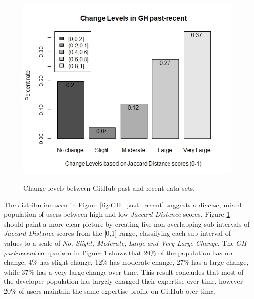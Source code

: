         \begin{figure}
          \centering
          \includegraphics[width=\textwidth]{figures/change_level_GH_past-recent.jpeg}\\
          \caption{Change levels between GitHub past and recent data sets.}
          \label{fig:change_GH_past_recent}
        \end{figure}
        
        The distribution seen in Figure \ref{fig:GH_past_recent} suggests a diverse, mixed population of users between high and low \emph{Jaccard Distance} scores. Figure \ref{fig:change_GH_past_recent} should paint a more clear picture by creating five non-overlapping sub-intervals of \emph{Jaccard Distance} scores from the [0,1] range, classifying each sub-interval of values to a scale of \emph{No, Slight, Moderate, Large and Very Large Change}. The \emph{GH past-recent} comparison in Figure \ref{fig:change_GH_past_recent} shows that 20\% of the population has no change, 4\% has slight change, 12\% has moderate change, 27\% has a large change, while 37\% has a very large change over time. This result concludes that most of the developer population has largely changed their expertise over time, however 20\% of users maintain the same expertise profile on GitHub over time.
        
